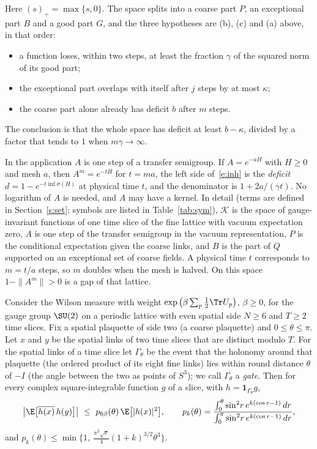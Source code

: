 Here $(s)_+=\max\{s,0\}$. The space splits into a coarse part $P$, an exceptional part $B$ and a good part
$G$, and the three hypotheses are (b), (c) and (a) above, in that order:
\begin{itemize}
\item a function loses, within two steps, at least the fraction $\gamma$ of the squared norm of its good
part;
\item the exceptional part overlaps with itself after $j$ steps by at most $\kappa$;
\item the coarse part alone already has deficit $b$ after $m$ steps.
\end{itemize}
The conclusion is that the whole space has deficit at least $b-\kappa$, divided by a factor that tends to $1$
when $m\gamma\to\infty$.

In the application $A$ is one step of a transfer semigroup. If $A=e^{-aH}$ with $H\ge0$ and mesh $a$, then
$A^m=e^{-tH}$ for $t=ma$, the left side of~\eqref{e:inh} is the \emph{deficit} $d=1-e^{-t\inf\sigma(H)}$ at
physical time $t$, and the denominator is $1+2a/(\gamma t)$. No logarithm of $A$ is needed, and $A$ may have
a kernel. In detail (terms are defined in Section~\ref{s:set}; symbols are listed in Table~\ref{tab:sym}),
$\mathcal K$ is the space of gauge-invariant functions of one time slice of the fine lattice with vacuum
expectation zero, $A$ is one step of the transfer semigroup in the vacuum representation, $P$ is the
conditional expectation given the coarse links, and $B$ is the part of $Q$ supported on an exceptional set of
coarse fields. A physical time $t$ corresponds to $m=t/a$ steps, so $m$ doubles when the mesh is halved. On
this space $1-\|A^m\|>0$ is a gap of that lattice.

\begin{theorem}\label{t:ret}
Consider the Wilson measure with weight $\exp\big(\beta\sum_p\tfrac12\Tr U_p\big)$, $\beta\ge0$, for the gauge
group $\SU(2)$ on a periodic lattice with even spatial side $N\ge6$ and $T\ge2$ time slices. Fix a spatial
plaquette of side two (a coarse plaquette) and $0\le\theta\le\pi$. Let $x$ and $y$ be the spatial links of
two time slices that are distinct modulo $T$. For the spatial links of a time slice let $\Gamma_\theta$ be the
event that the holonomy around that plaquette (the ordered product of its eight fine links) lies within round
distance $\theta$ of $-I$ (the angle between the two as points of $S^3$); we call $\Gamma_\theta$ a
\emph{gate}. Then for every complex square-integrable function $g$ of a slice, with
$h=\mathbf 1_{\Gamma_\theta}g$,
\begin{equation}\label{e:ret}
\big|\E\big[\overline{h(x)}\,h(y)\big]\big|\ \le\ p_{6\beta}(\theta)\,\E\big[|h(x)|^2\big],
\qquad
p_k(\theta)=\frac{\int_0^\theta\sin^2\!r\,e^{k(\cos r-1)}\,dr}{\int_0^\pi\sin^2\!r\,e^{k(\cos r-1)}\,dr},
\end{equation}
and $p_k(\theta)\le\min\{1,\ \tfrac{\pi^2\sqrt e}{4}(1+k)^{3/2}\theta^3\}$.
\end{theorem}

